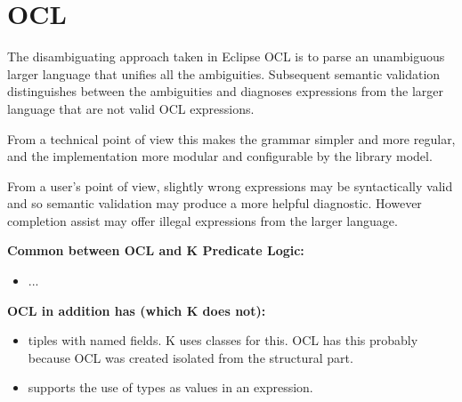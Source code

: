 

\section{OCL}
\label{sec:ocl}

The disambiguating approach taken in Eclipse OCL is to parse an unambiguous larger language that unifies all the ambiguities. Subsequent semantic validation distinguishes between the ambiguities and diagnoses expressions from the larger language that are not valid OCL expressions.

From a technical point of view this makes the grammar simpler and more regular, and the implementation more modular and configurable by the library model.

From a user’s point of view, slightly wrong expressions may be syntactically valid and so semantic validation may produce a more helpful diagnostic. However completion assist may offer illegal expressions from the larger language.

{\bf Common between OCL and K Predicate Logic:}

\begin{itemize}
  \item ...
\end{itemize}

{\bf OCL in addition has (which K does not):}

\begin{itemize}
  \item tiples with named fields. K uses classes for this. OCL has this probably because
  OCL was created isolated from the structural part.
  \item supports the use of types as values in an expression.
\end{itemize}




